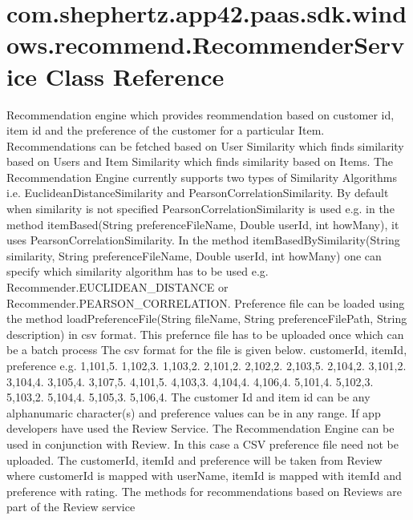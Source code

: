 \hypertarget{classcom_1_1shephertz_1_1app42_1_1paas_1_1sdk_1_1windows_1_1recommend_1_1_recommender_service}{\section{com.\+shephertz.\+app42.\+paas.\+sdk.\+windows.\+recommend.\+Recommender\+Service Class Reference}
\label{classcom_1_1shephertz_1_1app42_1_1paas_1_1sdk_1_1windows_1_1recommend_1_1_recommender_service}
}


Recommendation engine which provides reommendation based on customer id, item id and the preference of the customer for a particular Item. Recommendations can be fetched based on User Similarity which finds similarity based on Users and Item Similarity which finds similarity based on Items. The Recommendation Engine currently supports two types of Similarity Algorithms i.\+e. Euclidean\+Distance\+Similarity and Pearson\+Correlation\+Similarity. By default when similarity is not specified Pearson\+Correlation\+Similarity is used e.\+g. in the method item\+Based(\+String preference\+File\+Name, Double   user\+Id, int  how\+Many), it uses Pearson\+Correlation\+Similarity. In the method item\+Based\+By\+Similarity(\+String similarity, String preference\+File\+Name, Double   user\+Id, int  how\+Many) one can specify which similarity algorithm has to be used e.\+g. Recommender.\+E\+U\+C\+L\+I\+D\+E\+A\+N\+\_\+\+D\+I\+S\+T\+A\+N\+C\+E or Recommender.\+P\+E\+A\+R\+S\+O\+N\+\_\+\+C\+O\+R\+R\+E\+L\+A\+T\+I\+O\+N. Preference file can be loaded using the method load\+Preference\+File(\+String file\+Name, String preference\+File\+Path, String description) in csv format. This prefernce file has to be uploaded once which can be a batch process The csv format for the file is given below. customer\+Id, item\+Id, preference e.\+g. 1,101,5. 1,102,3. 1,103,2. 2,101,2. 2,102,2. 2,103,5. 2,104,2. 3,101,2. 3,104,4. 3,105,4. 3,107,5. 4,101,5. 4,103,3. 4,104,4. 4,106,4. 5,101,4. 5,102,3. 5,103,2. 5,104,4. 5,105,3. 5,106,4. The customer Id and item id can be any alphanumaric character(s) and preference values can be in any range. If app developers have used the Review Service. The Recommendation Engine can be used in conjunction with Review. In this case a C\+S\+V preference file need not be uploaded. The customer\+Id, item\+Id and preference will be taken from Review where customer\+Id is mapped with user\+Name, item\+Id is mapped with item\+Id and preference with rating. The methods for recommendations based on Reviews are part of the Review service  


